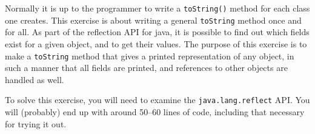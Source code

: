 \documentclass[11pt,a4paper,answers]{exam}
\begin{document}
\begin{questions}
\question
Normally it is up to the programmer to write a \verb!toString()! method for each class one creates. 
This exercise is about writing a general \verb!toString! method once and for all. 
As part of the reflection API for java, it is possible to find out which fields exist for a given object, 
and to get their values. The purpose of this exercise is to make a \verb!toString! method that gives a printed 
representation of any object, in such a manner that all fields are printed, 
and references to other objects are handled as well. 

To solve this exercise, you will need to examine the \verb!java.lang.reflect! API. 
You will (probably) end up with around 50--60 lines of code, including that necessary for trying it out. 
\end{questions}
\end{document}
